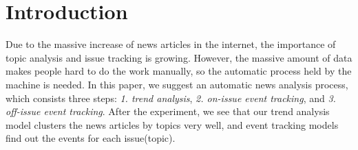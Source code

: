 \section{Introduction}

Due to the massive increase of news articles in the internet,
the importance of topic analysis and issue tracking is growing.
However, the massive amount of data makes people hard to do the work manually,
so the automatic process held by the machine is needed.
In this paper, we suggest an automatic news analysis process, which consists three steps:
\textit{1. trend analysis}, \textit{2. on-issue event tracking}, and \textit{3. off-issue event tracking}.
After the experiment, we see that our trend analysis model clusters the news articles by topics
very well, and event tracking models find out the events for each issue(topic). 